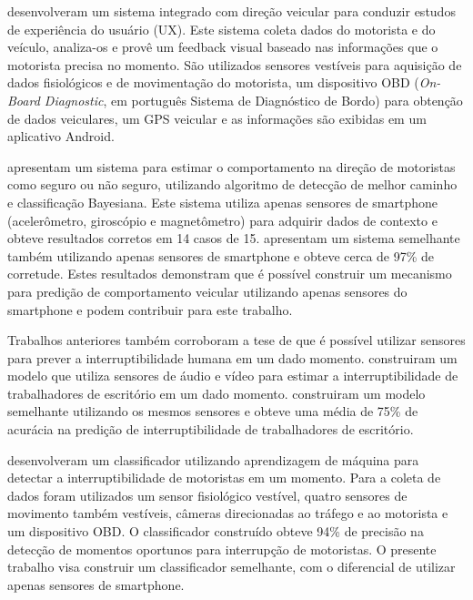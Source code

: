  desenvolveram um sistema integrado com direção veicular para conduzir estudos de experiência
do usuário (UX). Este sistema coleta dados do motorista e do veículo, analiza-os e provê um feedback visual baseado
nas informações que o motorista precisa no momento. São utilizados sensores vestíveis para aquisição de dados
fisiológicos e de movimentação do motorista, um dispositivo OBD (\textit{On-Board Diagnostic}, em português Sistema de Diagnóstico
de Bordo) para obtenção de dados veiculares, um GPS veicular e as informações são exibidas em um aplicativo Android.

 apresentam um sistema para estimar o comportamento na direção de motoristas como seguro ou
não seguro, utilizando algoritmo de detecção de melhor caminho e classificação Bayesiana. Este sistema utiliza
apenas sensores de smartphone (acelerômetro, giroscópio e magnetômetro) para adquirir dados de contexto e obteve
resultados corretos em 14 casos de 15.  apresentam um sistema semelhante também utilizando
apenas sensores de smartphone e obteve cerca de 97\% de corretude. Estes resultados demonstram que é possível construir
um mecanismo para predição de comportamento veicular utilizando apenas sensores do smartphone e podem contribuir
para este trabalho.

Trabalhos anteriores também corroboram a tese de que é possível utilizar sensores para prever a interruptibilidade
humana em um dado momento.  construiram um modelo que utiliza sensores de áudio e vídeo
para estimar a interruptibilidade de trabalhadores de escritório em um dado momento. 
construiram um modelo semelhante utilizando os mesmos sensores e obteve uma média de 75\% de acurácia na predição de
interruptibilidade de trabalhadores de escritório.

 desenvolveram um classificador utilizando aprendizagem de máquina para detectar a interruptibilidade
de motoristas em um momento. Para a coleta de dados foram utilizados um sensor fisiológico vestível, quatro sensores
de movimento também vestíveis, câmeras direcionadas ao tráfego e ao motorista e um dispositivo OBD. O classificador
construído obteve 94\% de precisão na detecção de momentos oportunos para interrupção de motoristas. O presente
trabalho visa construir um classificador semelhante, com o diferencial de utilizar apenas sensores de smartphone.
